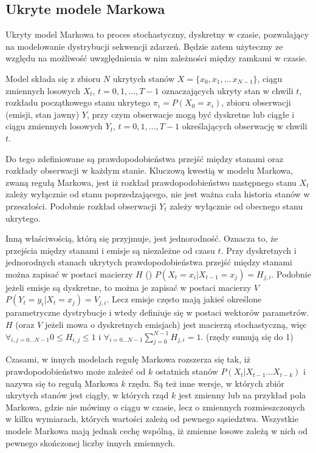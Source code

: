 \subsection{Ukryte modele Markowa}\label{sec:hmm}

Ukryty model Markowa to proces stochastyczny, dyskretny w czasie, pozwalający na modelowanie dystrybucji 
sekwencji zdarzeń. Będzie zatem użyteczny ze względu na możliwość uwzględnienia w nim zależności 
między ramkami w czasie.

Model składa się z zbioru $N$ ukrytych stanów $X = \{x_0, x_1, \dots\, x_{N-1}\}$, ciągu zmiennych losowych
$X_t$, $t = 0, 1, \dots, T - 1$ oznaczających ukryty stan w chwili $t$, rozkładu początkowego stanu ukrytego
$\pi_i = P(X_0 = x_i)$, zbioru obserwacji (emisji, stan jawny) $Y$, przy czym obserwacje mogą być dyskretne 
lub ciągłe i ciągu zmiennych losowych $Y_t$, $t = 0, 1, \dots, T - 1$ określających obserwację w chwili $t$.

Do tego zdefiniowane są prawdopodobieństwa przejść między stanami oraz rozkłady obserwacji w każdym stanie. 
Kluczową kwestią w modelu Markowa, zwaną regułą Markowa, jest iż rozkład prawdopodobieństwo następnego stanu $X_t$ 
zależy wyłącznie od stanu poprzedzającego, nie jest ważna cała historia stanów w przeszłości. Podobnie rozkład
obserwacji $Y_t$ zależy wyłącznie od obecnego stanu ukrytego. 

Inną właściwością, którą się przyjmuje, jest jednorodność. Oznacza to, że przejścia między stanami i emisje są
niezależne od czasu $t$. Przy dyskretnych i jednorodnych stanach ukrytych prawdopodobieństwa przejść
między stanami można zapisać w postaci macierzy $H$ () $P(X_t = x_i | X_{t-1} = x_j) = H_{j, i}$.
Podobnie jeżeli emisje są dyskretne, to można je zapisać w postaci macierzy $V$ $P(Y_t = y_i | X_t = x_j) = V_{j, i}$.
Lecz emisje często mają jakieś określone parametryczne dystrybucje i wtedy definiuje się w postaci wektorów parametrów.
$H$ (oraz $V$ jeżeli mowa o dyskretnych emisjach) jest macierzą stochastyczną, więc $\forall_{i, j = 0 \dots N - 1} 0 \leq H_{i, j} \leq 1$ i $\forall_{i = 0 \dots N - 1} \sum_{j = 0}^{N - 1} H_{j, i} = 1$. (rzędy sumują się do 1)

Czasami, w innych modelach regułę Markowa rozszerza się tak, iż prawdopodobieństwo może zależeć od $k$ ostatnich stanów
$P(X_t | X_{t-1} \dots X_{t-k})$ i nazywa się to regułą Markowa $k$ rzędu. Są też inne wersje, w których zbiór
ukrytych stanów jest ciągły, w których rząd $k$ jest zmienny lub na przykład pola Markowa, 
gdzie nie mówimy o ciągu w czasie, lecz o zmiennych rozmieszczonych
w kilku wymiarach, których wartości zależą od pewnego sąsiedztwa. Wszystkie modele Markowa mają jednak cechę wspólną, iż
zmienne losowe zależą w nich od pewnego skończonej liczby innych zmiennych.

